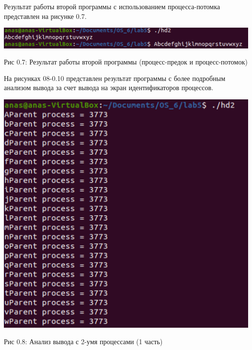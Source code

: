 \documentclass[12pt]{report}
\begin{document}
Результат работы второй программы с использованием процесса-потомка представлен на рисунке 0.7.

\begin{center}
		\includegraphics[scale=0.5]{pics/Res2_4.png}
		
			Рис 0.7: Результат работы второй программы (процесс-предок и процесс-потомок)
\end{center}

На рисунках 08-0.10 представлен результат программы с более подробным анализом вывода за счет вывода на экран идентификаторов процессов.

\begin{center}
		\includegraphics[scale=0.6]{pics/Res2_1.png}
		
			Рис 0.8: Анализ вывода с 2-умя процессами (1 часть)
\end{center}
\end{document}
